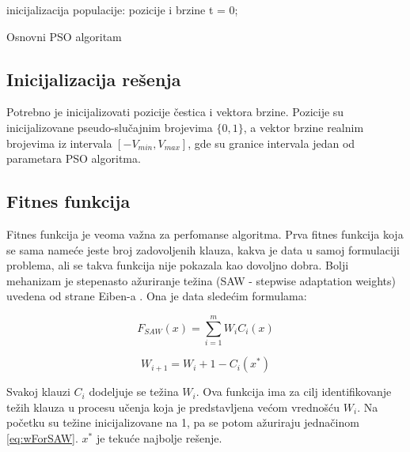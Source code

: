\documentclass{article}
\begin{document}
\begin{algorithm}[H]
\SetAlgoLined
{}

\BlankLine
 inicijalizacija populacije: pozicije i brzine\;
 t = 0; \\
\caption{Osnovni PSO algoritam}
\end{algorithm}


\subsection{Inicijalizacija rešenja}
\label{sec:pso_init}

Potrebno je inicijalizovati pozicije čestica i vektora brzine. Pozicije su inicijalizovane pseudo-slučajnim brojevima $\{0,1\}$, a vektor brzine realnim brojevima iz intervala $[-V_{min}, V_{max}]$, gde su granice intervala jedan od parametara PSO algoritma.


\subsection{Fitnes funkcija}
\label{sec:pso_fitness}
Fitnes funkcija je veoma važna za perfomanse algoritma.
Prva fitnes funkcija koja se sama nameće jeste broj zadovoljenih klauza, kakva je data u samoj formulaciji problema, ali se takva funkcija nije pokazala kao dovoljno dobra. Bolji mehanizam je stepenasto ažuriranje težina (SAW - stepwise adaptation weights) uvedena od strane Eiben-a \cite{fitnes}. Ona je data sledećim formulama:

\begin{equation}\label{eq:SAW}
F_{SAW}(x) = \sum_{i=1}^{m} W_iC_i(x)
\end{equation}

\begin{equation}\label{eq:wForSAW}
W_{i+1} = W_{i} + 1 - C_i(x^*)
\end{equation}

Svakoj klauzi $C_i$ dodeljuje se težina $W_i$. Ova funkcija ima za cilj identifikovanje težih klauza u procesu učenja koja je predstavljena većom vrednošću $W_i$. Na početku su težine inicijalizovane na 1, pa se potom ažuriraju jednačinom \ref{eq:wForSAW}. $x^*$ je tekuće najbolje rešenje.
\end{document}
